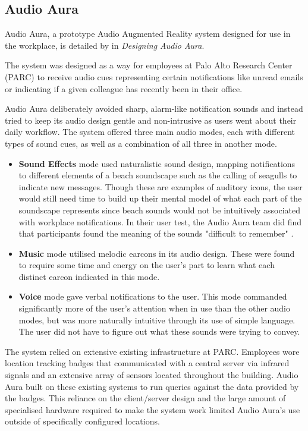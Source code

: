 \documentclass{l4proj}
\begin{document}
\subsection{Audio Aura}
Audio Aura, a prototype Audio Augmented Reality system designed for use in the workplace, is detailed by \citet{mynatt_designing_1998} in \textit{Designing Audio Aura}. 

The system was designed as a way for employees at Palo Alto Research Center (PARC) to receive audio cues representing certain notifications like unread emails or indicating if a given colleague has recently been in their office. 

Audio Aura deliberately avoided sharp, alarm-like notification sounds and instead tried to keep its audio design gentle and non-intrusive as users went about their daily workflow. The system offered three main audio modes, each with different types of sound cues, as well as a combination of all three in another mode. 
\begin{itemize}
    \item \textbf{Sound Effects} mode used naturalistic sound design, mapping notifications to different elements of a beach soundscape such as the calling of seagulls to indicate new messages. Though these are examples of auditory icons, the user would still need time to build up their mental model of what each part of the soundscape represents since beach sounds would not be intuitively associated with workplace notifications. In their user test, the Audio Aura team did find that participants found the meaning of the sounds "difficult to remember" \citep{mynatt_designing_1998}.
    \item \textbf{Music} mode utilised melodic earcons in its audio design. These were found to require some time and energy on the user's part to learn what each distinct earcon indicated in this mode. 
    \item \textbf{Voice} mode gave verbal notifications to the user. This mode commanded significantly more of the user's attention when in use than the other audio modes, but was more naturally intuitive through its use of simple language. The user did not have to figure out what these sounds were trying to convey.
\end{itemize}

The system relied on extensive existing infrastructure at PARC. Employees wore location tracking badges that communicated with a central server via infrared signals and an extensive array of sensors located throughout the building. Audio Aura built on these existing systems to run queries against the data provided by the badges. This reliance on the client/server design and the large amount of specialised hardware required to make the system work limited Audio Aura's use outside of specifically configured locations.
\end{document}
